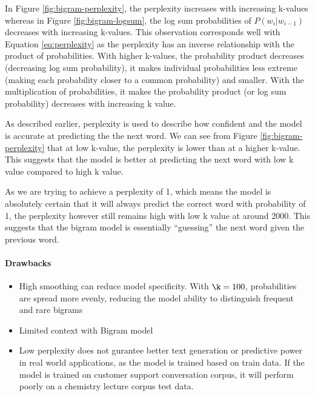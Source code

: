 In Figure \ref{fig:bigram-perplexity}, the perplexity increases with increasing k-values whereas in Figure \ref{fig:bigram-logsum}, the log sum probabilities of $P(w_i | w_{i-1})$ decreases with increasing k-values.
This observation corresponds well with Equation \ref{eq:perplexity} as the perplexity has an inverse relationship with the product of probabilities.
With higher k-values, the probability product decreases (decreasing log sum probability), it makes individual probabilities less extreme (making each probability closer to a common probability) and smaller. 
With the multiplication of probabilities, it makes the probability product (or log sum probability) decreases with increasing k value.

As described earlier, perplexity is used to describe how confident and the model is accurate at predicting the the next word.
We can see from Figure \ref{fig:bigram-perplexity} that at low k-value, the perplexity is lower than at a higher k-value. 
This suggests that the model is better at predicting the next word with low k value compared to high k value. 

As we are trying to achieve a perplexity of 1, which means the model is absolutely certain that it will always predict the correct word with probability of 1,
the perplexity however still remains high with low k value at around 2000. 
This suggests that the bigram model is essentially ``guessing'' the next word given the previous word. 



\paragraph{Drawbacks}
\begin{itemize}
    \item High smoothing can reduce model specificity.
    With $\k = 100$, probabilities are spread more evenly, reducing the model ability to distinguish frequent and rare bigrams 
    \item Limited context with Bigram model
    \item Low perplexity does not gurantee better text generation or predictive power in real world applications, as the model is trained based on train data. 
    If the model is trained on customer support conversation corpus, it will perform poorly on a chemistry lecture corpus test data.
\end{itemize}



